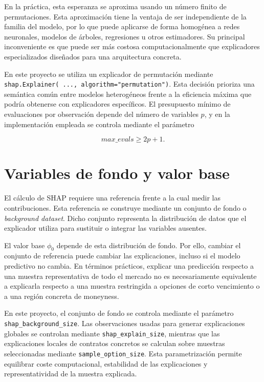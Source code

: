 En la práctica, esta esperanza se aproxima usando un número finito de permutaciones. Esta aproximación tiene la ventaja de ser independiente de la familia del modelo, por lo que puede aplicarse de forma homogénea a redes neuronales, modelos de árboles, regresiones u otros estimadores. Su principal inconveniente es que puede ser más costosa computacionalmente que explicadores especializados diseñados para una arquitectura concreta.

En este proyecto se utiliza un explicador de permutación mediante \texttt{shap.Explainer( ..., algorithm="permutation")}. Esta decisión prioriza una semántica común entre modelos heterogéneos frente a la eficiencia máxima que podría obtenerse con explicadores específicos. El presupuesto mínimo de evaluaciones por observación depende del número de variables \(p\), y en la implementación empleada se controla mediante el parámetro

\begin{equation}
max\_evals \geq 2p+1.
\label{eq:shap-evals}
\end{equation}

\section{Variables de fondo y valor base}

El cálculo de SHAP requiere una referencia frente a la cual medir las contribuciones. Esta referencia se construye mediante un conjunto de fondo o \emph{background dataset}. Dicho conjunto representa la distribución de datos que el explicador utiliza para sustituir o integrar las variables ausentes.

El valor base \(\phi_0\) depende de esta distribución de fondo. Por ello, cambiar el conjunto de referencia puede cambiar las explicaciones, incluso si el modelo predictivo no cambia. En términos prácticos, explicar una predicción respecto a una muestra representativa de todo el mercado no es necesariamente equivalente a explicarla respecto a una muestra restringida a opciones de corto vencimiento o a una región concreta de moneyness.

En este proyecto, el conjunto de fondo se controla mediante el parámetro \texttt{shap\_background\_size}. Las observaciones usadas para generar explicaciones globales se controlan mediante \texttt{shap\_explain\_size}, mientras que las explicaciones locales de contratos concretos se calculan sobre muestras seleccionadas mediante \texttt{sample\_option\_size}. Esta parametrización permite equilibrar coste computacional, estabilidad de las explicaciones y representatividad de la muestra explicada.

